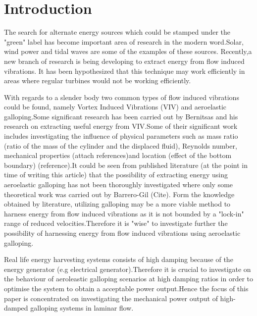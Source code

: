 \section{Introduction} 
The search for alternate energy sources which could be stamped under the "green" label has become important area of research in the modern word.Solar, wind power and tidal waves are some of the examples of these sources.  Recently,a new branch of research is being developing to extract energy from flow induced vibrations\cite{Bernitsas2008a-concept}. It has been hypothesized that this technique may work efficiently in areas where regular turbines would not be working efficiently. 

With regards to a slender body two common types of flow induced vibrations could   be found, namely Vortex Induced Vibrations (VIV) and aeroelastic galloping.Some significant research has been carried out by Bernitsas and his research on extracting useful energy from VIV.Some of their significant work includes investigating the influence  of physical parameters such as mass ratio (ratio of the mass of the cylinder and the displaced fluid), Reynolds number, mechanical properties (attach references)and location (effect of the bottom boundary) (reference).It could be seen from published literature (at the point in time of writing this article) that the possibility of extracting energy using aeroelastic galloping has not been thoroughly investigated where only some theoretical work was carried out by Barrero-Gil (Cite). Form the knowledge obtained by literature, utilizing galloping may be a more viable method to harness energy from flow induced vibrations as it is not bounded by a "lock-in" range of reduced velocities.Therefore it is "wise" to investigate further the possibility of harnessing energy from flow induced vibrations using aeroelastic galloping.

Real life energy harvesting systems consists of high damping because of the energy generator (e.g electrical generator).Therefore it is crucial to investigate on the behaviour of aeroleastic galloping scenarios at high damping ratios in order to optimise the system to obtain a acceptable power output.Hence the focus of this paper is concentrated on investigating the mechanical power output of high-damped galloping systems in laminar flow.


























 
